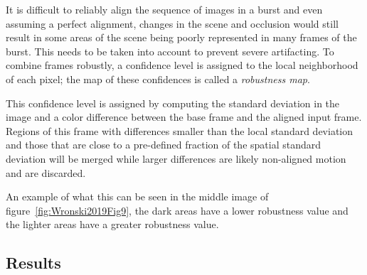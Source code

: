 \documentclass{sig-alternate}
\begin{document}
 
It is difficult to reliably align the sequence of images in a burst and even assuming a perfect alignment, changes in the scene and occlusion would still result in some areas of the scene being poorly represented in many frames of the burst. This needs to be taken into account to prevent severe artifacting. To combine frames robustly, a confidence level is assigned to the local neighborhood of each pixel; the map of these confidences is called a \emph{robustness map}.

This confidence level is assigned by computing the standard deviation in the image and a color difference between the base frame and the aligned input frame. Regions of this frame with differences smaller than the local standard deviation and those that are close to a pre-defined fraction of the spatial standard deviation will be merged while larger differences are likely non-aligned motion and are discarded.

An example of what this can be seen in the middle image of figure~\ref{fig:Wronski2019Fig9}, the dark areas have a lower robustness value and the lighter areas have a greater robustness value.






\subsection{Results}
\end{document}
